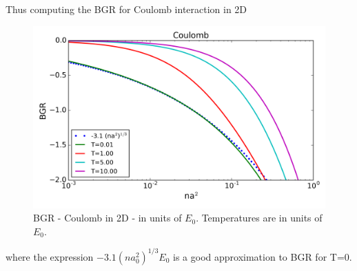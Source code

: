 \documentclass[aps,prb,onecolumn,notitlepage,showpacs,floatfix,superscriptaddress]{revtex4-1}
\begin{document}
Thus computing the BGR for Coulomb interaction in 2D 
\begin{figure}[hbtp]
\centering
\includegraphics[scale=0.5]{BGR_Haug.png}
\caption{BGR - Coulomb in 2D - in units of $E_0$. Temperatures are in units of $E_0$.}
\end{figure}
where the expression $-3.1 (n a_0^2)^{1/3} E_0$ is a good approximation to BGR for T=0.
\end{document}
